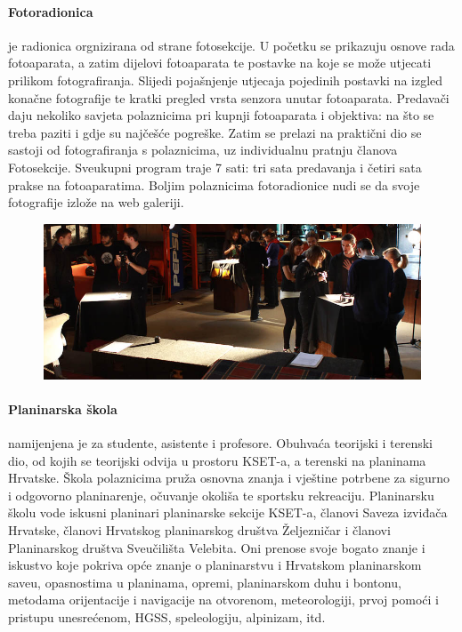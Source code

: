 \documentclass[12pt,a4paper,oneside]{article}
\begin{document}
	\paragraph{Fotoradionica}je radionica orgnizirana od strane fotosekcije. U početku se prikazuju osnove rada fotoaparata, a zatim dijelovi fotoaparata te postavke na koje se može utjecati prilikom fotografiranja. Slijedi pojašnjenje utjecaja pojedinih postavki na izgled konačne fotografije te kratki pregled vrsta senzora unutar fotoaparata. Predavači daju nekoliko savjeta polaznicima pri kupnji fotoaparata i objektiva: na što se treba paziti i gdje su najčešće pogreške. Zatim se prelazi na praktični dio se sastoji od fotografiranja s polaznicima, uz individualnu pratnju članova Fotosekcije. Sveukupni program traje 7 sati: tri sata predavanja i četiri sata prakse na fotoaparatima. Boljim polaznicima fotoradionice nudi se da svoje fotografije izlože na web galeriji.
	
	\begin{figure}[h!]
		\centering
		\vspace{5mm}
		\includegraphics[scale=0.55]{fotoradionica.jpg}	
	\end{figure}
	
	\paragraph{Planinarska škola} namijenjena je za studente, asistente i profesore. Obuhvaća teorijski i terenski dio, od kojih se teorijski odvija u prostoru KSET-a, a terenski na planinama Hrvatske. Škola polaznicima pruža osnovna znanja i vještine potrbene za sigurno i odgovorno planinarenje, očuvanje okoliša te sportsku rekreaciju. Planinarsku školu vode iskusni planinari planinarske sekcije KSET-a, članovi Saveza izviđača Hrvatske, članovi Hrvatskog planinarskog društva Željezničar i članovi Planinarskog društva Sveučilišta Velebita. Oni prenose svoje bogato znanje i iskustvo koje pokriva opće znanje o planinarstvu i Hrvatskom planinarskom saveu, opasnostima u planinama, opremi, planinarskom duhu i bontonu, metodama orijentacije i navigacije na otvorenom, meteorologiji, prvoj pomoći i pristupu unesrećenom, HGSS, speleologiju, alpinizam, itd.
	
\end{document}
